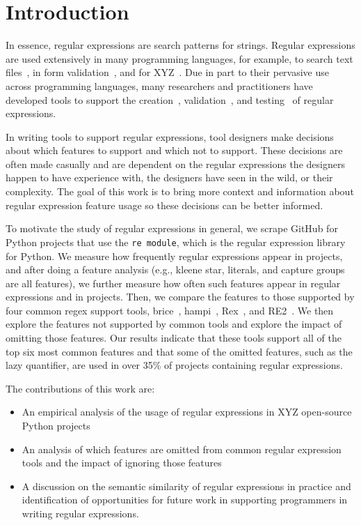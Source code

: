 \section{Introduction}

 In essence, regular expressions are search patterns for strings. Regular expressions are used extensively in many programming languages, for example, to search text files~\cite{Clarke:1997:URE:256167.256174}, in form validation~\cite{}, and for XYZ~\cite{}. Due in part to their pervasive use across programming languages, many researchers and practitioners have developed tools to support the creation~\cite{}, validation~\cite{}, and testing~\cite{} of regular expressions.

 In writing tools to support regular expressions, tool designers make decisions about which features to support and which not to support. These decisions are often made casually and are dependent on the regular expressions the designers happen to have experience with, the designers have seen in the wild, or their complexity. The goal of this work is to bring more context and information about regular expression feature usage so these decisions can be better informed.

To motivate the study of regular expressions in general, we scrape GitHub for Python projects that use the {\tt re module}, which is the regular expression library for Python. We measure how frequently regular expressions appear in projects, and after doing a feature analysis (e.g., kleene star, literals, and capture groups are all features), we further measure how often such features appear in regular expressions and in projects. Then, we compare the features to those supported by four common regex support tools, brice~\cite{}, hampi~\cite{}, Rex~\cite{}, and RE2~\cite{}. We then explore the features not supported by common tools and explore the impact of omitting those features. Our results indicate that these tools support all of the top six most common features and that some of the omitted features, such as the lazy quantifier, are used in over 35\% of projects containing regular expressions.

The contributions of this work are:

\begin{itemize}
	\item An empirical analysis of the usage of regular expressions in XYZ open-source Python projects
	\item An analysis of which features are omitted from common regular expression tools and the impact of ignoring those features
	\item A discussion on the semantic similarity of regular expressions in practice and identification of opportunities for future work in supporting programmers in writing regular expressions.
\end{itemize}

